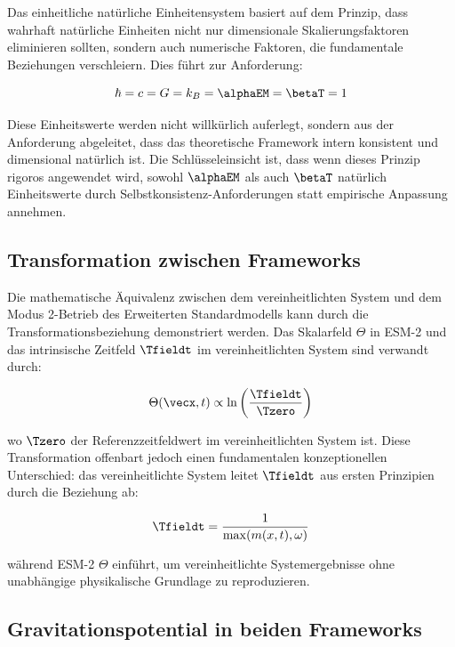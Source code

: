 	Das einheitliche natürliche Einheitensystem basiert auf dem Prinzip, dass wahrhaft natürliche Einheiten nicht nur dimensionale Skalierungsfaktoren eliminieren sollten, sondern auch numerische Faktoren, die fundamentale Beziehungen verschleiern. Dies führt zur Anforderung:
	
	\begin{equation}
		\hbar = c = G = k_B = \alphaEM = \betaT = 1
	\end{equation}
	
	Diese Einheitswerte werden nicht willkürlich auferlegt, sondern aus der Anforderung abgeleitet, dass das theoretische Framework intern konsistent und dimensional natürlich ist. Die Schlüsseleinsicht ist, dass wenn dieses Prinzip rigoros angewendet wird, sowohl $\alphaEM$ als auch $\betaT$ natürlich Einheitswerte durch Selbstkonsistenz-Anforderungen statt empirische Anpassung annehmen.
	
	\subsection{Transformation zwischen Frameworks}
	\label{subsec:transformation}
	
	Die mathematische Äquivalenz zwischen dem vereinheitlichten System und dem Modus 2-Betrieb des Erweiterten Standardmodells kann durch die Transformationsbeziehung demonstriert werden. Das Skalarfeld $\Theta$ in ESM-2 und das intrinsische Zeitfeld $\Tfieldt$ im vereinheitlichten System sind verwandt durch:
	
	\begin{equation}
		\Theta(\vecx,t) \propto \ln\left(\frac{\Tfieldt}{\Tzero}\right)
	\end{equation}
	
	wo $\Tzero$ der Referenzzeitfeldwert im vereinheitlichten System ist. Diese Transformation offenbart jedoch einen fundamentalen konzeptionellen Unterschied: das vereinheitlichte System leitet $\Tfieldt$ aus ersten Prinzipien durch die Beziehung ab:
	
	\begin{equation}
		\Tfieldt = \frac{1}{\max(m(x,t), \omega)}
	\end{equation}
	
	während ESM-2 $\Theta$ einführt, um vereinheitlichte Systemergebnisse ohne unabhängige physikalische Grundlage zu reproduzieren.
	
	\subsection{Gravitationspotential in beiden Frameworks}
	\label{subsec:gravitational_potential}
	
